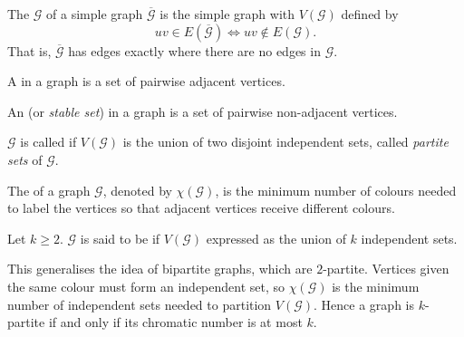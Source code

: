 \begin{definition}
The  $\mathcal{G}$ of a simple graph $\overline{\mathcal{G}}$ is the simple graph with $V(\mathcal{G})$ defined by
\[uv\in E(\overline{\mathcal{G}})\iff uv\notin E(\mathcal{G}).\] 
That is, $\overline{\mathcal{G}}$ has edges exactly where there are no edges in $\mathcal{G}$.

A  in a graph is a set of pairwise adjacent vertices.

An  (or \emph{stable set}) in a graph is a set of pairwise non-adjacent vertices.
\end{definition}

\begin{definition}
$\mathcal{G}$ is called  if $V(\mathcal{G})$ is the union of two disjoint independent sets, called \emph{partite sets} of $\mathcal{G}$.

\end{definition}

\begin{definition}
The  of a graph $\mathcal{G}$, denoted by $\chi(\mathcal{G})$, is the minimum number of colours needed to label the vertices so that adjacent vertices receive different colours.

Let $k\ge2$. $\mathcal{G}$ is said to be  if $V(\mathcal{G})$ expressed as the union of $k$ independent sets.

\end{definition}

This generalises the idea of bipartite graphs, which are $2$-partite. Vertices given the same colour must form an independent set, so $\chi(\mathcal{G})$ is the minimum number of independent sets needed to partition $V(\mathcal{G})$. Hence a graph is $k$-partite if and only if its chromatic number is at most $k$.



